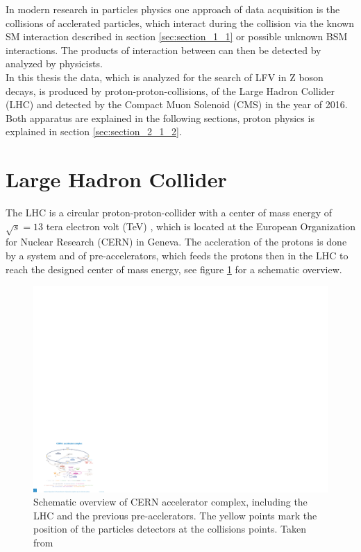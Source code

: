 In modern research in particles physics one approach of data acquisition is the collisions of acclerated particles, which interact during the collision via the known \gls{SM} interaction described in section \ref{sec:section_1_1} or possible unknown \gls{BSM} interactions. The products of interaction between can then be detected by analyzed by physicists. \\

In this thesis the data, which is analyzed for the search of \gls{LFV} in Z boson decays, is produced by proton-proton-collisions, of the Large Hadron Collider (\gls{LHC}) \cite{LHC} and detected by the Compact Muon Solenoid (\gls{CMS}) \cite{CMS} in the year of 2016. Both apparatus are explained in the following sections, proton physics is explained in section \ref{sec:section_2_1_2}.


\section{Large Hadron Collider}
\label{sec:section_2_1}

The \gls{LHC} is a circular proton-proton-collider with a center of mass energy of $\sqrt{s} = 13$ tera electron volt (\gls{TeV}) \cite{LHC2}, which is located at the European Organization for Nuclear Research (\gls{CERN}) in Geneva. The accleration of the protons is done by a system and of pre-accelerators, which feeds the protons then in the LHC to reach the designed center of mass energy, see figure \ref{fig:fig_2_1} for a schematic overview. \\

\begin{figure}[ht]
	\centering
	\includegraphics[width=1.0\textwidth]{pictures/LHC.pdf}

	\caption[Schematic overview of CERN accelerator complex]{Schematic overview of \gls{CERN} accelerator complex, including the \gls{LHC} and the previous pre-acclerators. The yellow points mark the position of the particles detectors at the collisions points. Taken from \cite{LHCACCL}}
	\label{fig:fig_2_1}
\end{figure}

